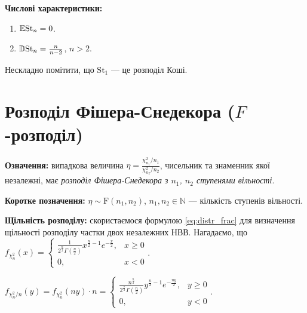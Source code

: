 \noindent\textbf{Числові характеристики:}
\begin{enumerate}
    \item $\mathbb{E}\mathrm{St}_n = 0$.
    \item $\mathbb{D}\mathrm{St}_n = \frac{n}{n-2}$, $n>2$.
\end{enumerate}

\begin{remark}
    Нескладно помітити, що $\mathrm{St}_1$ --- це розподіл Коші.
\end{remark}

\section{Розподіл Фішера-Снедекора (\texorpdfstring{$F$}{F}-розподіл)}
\noindent\textbf{Означення:} випадкова величина $\eta = \frac{\chi_{n_1}^2/n_1}{\chi_{n_2}^2/n_2}$, чисельник
та знаменник якої незалежні, має \emph{розподіл Фішера-Снедекора з $n_1$, $n_2$ ступенями вільності}.

\noindent\textbf{Коротке позначення:} $\eta \sim \mathrm{F}(n_1, n_2)$, $n_1, n_2\in\mathbb{N}$ --- кількість ступенів вільності.

\noindent\textbf{Щільність розподілу:} скористаємося формулою \eqref{eq:distr_frac} для визначення щільності розподілу частки
двох незалежних НВВ. Нагадаємо, що 
$f_{\chi_n^2}(x) = \begin{cases}
    \frac{1}{2^{\frac{n}{2}} \Gamma\left(\frac{n}{2}\right)} x^{\frac{n}{2}-1} e^{-\frac{x}{2}}, & x \geq 0 \\
    0, & x < 0
\end{cases}$.

 $f_{\chi_n^2/n}(y) = f_{\chi_n^2}(n y) \cdot n = 
\begin{cases}
    \frac{n^{\frac{n}{2}}}{2^{\frac{n}{2}} \Gamma\left(\frac{n}{2}\right)} y^{\frac{n}{2}-1} e^{-\frac{ny}{2}}, & y \geq 0 \\
    0, & y < 0
\end{cases}$.

